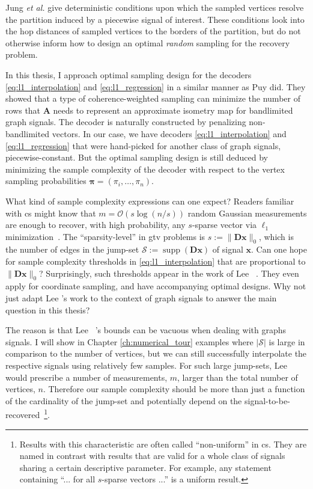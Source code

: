 Jung \textit{et al.} \cite{jung2016} give deterministic conditions upon which the sampled vertices resolve the partition induced by a piecewise signal of interest. These conditions look into the hop distances of sampled vertices to the borders of the partition, but do not otherwise inform how to design an optimal \emph{random} sampling for the recovery problem.

In this thesis, I approach optimal sampling design for the decoders \eqref{eq:l1_interpolation} and \eqref{eq:l1_regression} in a similar manner as Puy \etal \cite{puy2016} did. They showed that a type of coherence-weighted sampling can minimize the number of rows that $\mathbf{A}$ needs to represent an approximate isometry map for bandlimited graph signals. The decoder is naturally constructed by penalizing non-bandlimited vectors. In our case, we have decoders \eqref{eq:l1_interpolation} and \eqref{eq:l1_regression} that were hand-picked for another class of graph signals, piecewise-constant. But the optimal sampling design is still deduced by minimizing the sample complexity of the decoder with respect to the vertex sampling probabilities $\bm{\pi} = (\pi_i, \dots, \pi_n)$.

What kind of sample complexity expressions can one expect? Readers familiar with \acrlong{cs} might know that $m = \mathcal{O} \left( s \log (n/s) \right)$ random Gaussian measurements are enough to recover, with high probability, any $s$-sparse vector via $\ell_1$ minimization~\cite[Chapter 9]{foucart2013}. The ``sparsity-level'' in \acrfull{gtv} problems is $s := \|\mathbf{Dx}\|_0$, which is the number of edges in the jump-set $\mathcal{S} := \operatorname{supp}\left ( \mathbf{Dx} \right )$ of signal $\mathbf{x}$. Can one hope for sample complexity thresholds in \eqref{eq:l1_interpolation} that are proportional to $\|\mathbf{Dx}\|_0$? Surprisingly, such thresholds appear in the work of Lee \etal~\cite{lee2018}. They even apply for coordinate sampling, and have accompanying optimal designs. Why not just adapt Lee \etal's work to the context of graph signals to answer the main question in this thesis?

The reason is that Lee \etal~\cite{lee2018}'s bounds can be vacuous when dealing with graphs signals. I will show in Chapter \ref{ch:numerical_tour} examples where $|\mathcal{S}|$ is large in comparison to the number of vertices, but we can still successfully interpolate the respective signals using relatively few samples. For such large jump-sets, Lee \etal~\cite{lee2018} would prescribe a number of measurements, $m$, larger than the total number of vertices, $n$. Therefore our sample complexity should be more than just a function of the cardinality of the jump-set and potentially depend on the signal-to-be-recovered~\footnote{Results with this characteristic are often called ``non-uniform'' in \acrlong{cs}. They are named in contrast with results that are valid for a whole class of signals sharing a certain descriptive parameter. For example, any statement containing ``... for all $s$-sparse vectors ...'' is a uniform result.}.


